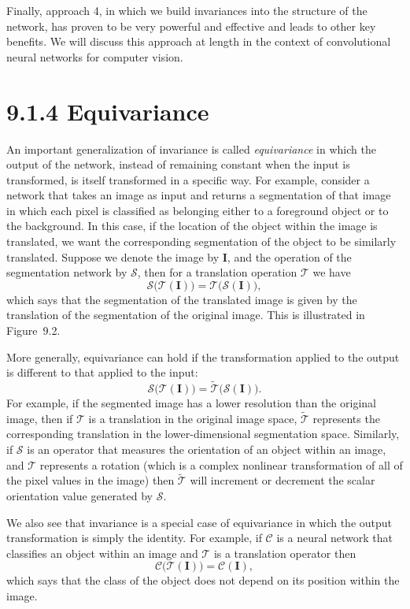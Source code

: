 \documentclass{article}
\begin{document}
Finally, approach 4, in which we build invariances into the structure of the network, has proven to be very powerful and effective and leads to other key benefits. We will discuss this approach at length in the context of convolutional neural networks for computer vision.

\section{9.1.4 Equivariance}

An important generalization of invariance is called \emph{equivariance} in which the output of the network, instead of remaining constant when the input is transformed, is itself transformed in a specific way. For example, consider a network that takes an image as input and returns a segmentation of that image in which each pixel is classified as belonging either to a foreground object or to the background. In this case, if the location of the object within the image is translated, we want the corresponding segmentation of the object to be similarly translated. Suppose we denote the image by $\mathbf{I}$, and the operation of the segmentation network by $\mathcal{S}$, then for a translation operation $\mathcal{T}$ we have
\begin{equation}
\mathcal{S}\bigl(\mathcal{T}(\mathbf{I})\bigr) = \mathcal{T}\bigl(\mathcal{S}(\mathbf{I})\bigr),
\tag{9.2}
\end{equation}
which says that the segmentation of the translated image is given by the translation of the segmentation of the original image. This is illustrated in Figure~9.2.

More generally, equivariance can hold if the transformation applied to the output is different to that applied to the input:
\begin{equation}
\mathcal{S}\bigl(\mathcal{T}(\mathbf{I})\bigr) = \widetilde{\mathcal{T}}\bigl(\mathcal{S}(\mathbf{I})\bigr).
\tag{9.3}
\end{equation}
For example, if the segmented image has a lower resolution than the original image, then if $\mathcal{T}$ is a translation in the original image space, $\widetilde{\mathcal{T}}$ represents the corresponding translation in the lower-dimensional segmentation space. Similarly, if $\mathcal{S}$ is an operator that measures the orientation of an object within an image, and $\mathcal{T}$ represents a rotation (which is a complex nonlinear transformation of all of the pixel values in the image) then $\widetilde{\mathcal{T}}$ will increment or decrement the scalar orientation value generated by $\mathcal{S}$.

We also see that invariance is a special case of equivariance in which the output transformation is simply the identity. For example, if $\mathcal{C}$ is a neural network that classifies an object within an image and $\mathcal{T}$ is a translation operator then
\begin{equation}
\mathcal{C}\bigl(\mathcal{T}(\mathbf{I})\bigr) = \mathcal{C}(\mathbf{I}),
\tag{9.4}
\end{equation}
which says that the class of the object does not depend on its position within the image.
\end{document}
